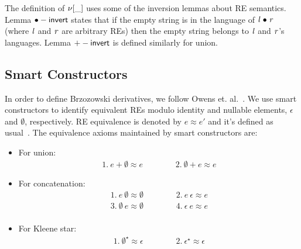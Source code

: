 \documentclass[fleqn,10pt]{SelfArx} %
\theoremstyle{definition}
\newcommand{\C}[1]{\red{\mathsf{#1}}}
\newcommand{\F}[1]{\green{\mathsf{#1}}}
\newcommand{\V}[1]{\purple{\mathit{#1}}}
\begin{document}
The definition of \ensuremath{\F{\nu[\_]}} uses some of the inversion lemmas about
RE semantics. Lemma \ensuremath{\F{\bullet -invert}} states that if the empty string
is in the language of \ensuremath{\V{l}\;\C{\bullet}\;\V{r}} (where \ensuremath{\V{l}} and \ensuremath{\V{r}} are arbitrary REs)
then the empty string belongs to \ensuremath{\V{l}} and \ensuremath{\V{r}}'s languages.
Lemma \ensuremath{\F{+-invert}} is defined similarly for union.

\subsection{Smart Constructors}\label{sec:smart}

In order to define Brzozowski derivatives, we follow Owens et. al.~\cite{Owens2009}. We use
smart constructors to identify equivalent REs modulo identity and nullable
elements, $\epsilon$ and $\emptyset$, respectively. RE equivalence is
denoted by $e \approx e'$ and it's defined as usual~\cite{Hopcroft2000}.
The equivalence axioms maintained by smart constructors are:
\begin{itemize}
    \item For union:
      \[
          \begin{array}{ccc}
              1.\: e + \emptyset \approx e &\hspace{1cm} & 2.\: \emptyset + e \approx e
          \end{array}
      \]
      \item For concatenation:
      \[
          \begin{array}{ccc}
              1.\: e\:\emptyset \approx \emptyset & \hspace{1cm} & 2.\: e\:\epsilon \approx e\\
              3.\: \emptyset\:e\approx \emptyset & & 4.\: \epsilon\: e \approx e\\
          \end{array}
      \]
      \item For Kleene star:
      \[
           \begin{array}{ccc}
               1.\: \emptyset^\star \approx \epsilon & \hspace{1cm} & 2.\: \epsilon^\star
                                                  \approx \epsilon
           \end{array}
      \]
\end{itemize}
\end{document}
